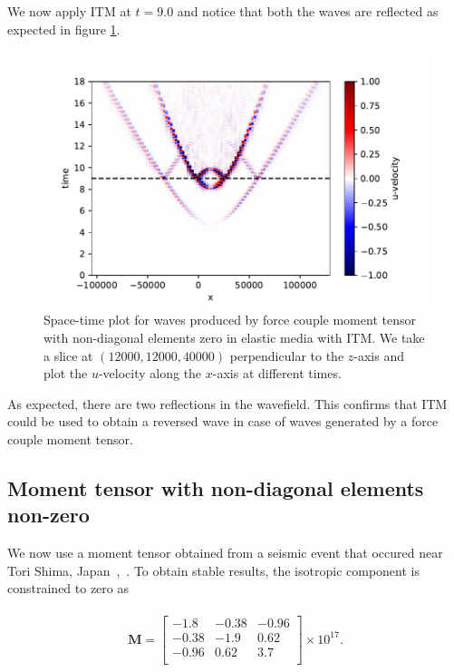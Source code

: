 We now apply \ac{ITM} at $t=9.0$ and notice that both the waves are reflected as expected in figure \ref{fig:space-timeplot-doublecouplediagITM}.

\begin{figure}[htpb]
    \centering
    \includegraphics[width=0.8\linewidth]{figures/double-couple-diag.pdf}
    \caption{Space-time plot for waves produced by force couple moment tensor with non-diagonal elements zero in elastic media with \ac{ITM}. We take a slice at $\left(12000,12000,40000\right)$ perpendicular to the $z$-axis and plot the $u$-velocity along the $x$-axis at different times.}
    \label{fig:space-timeplot-doublecouplediagITM}
\end{figure}
As expected, there are two reflections in the wavefield. This confirms that \ac{ITM} could be used to obtain a reversed wave in case of waves generated by a force couple moment tensor.

\subsection{Moment tensor with non-diagonal elements non-zero}
We now use a moment tensor obtained from a seismic event that occured near Tori Shima, Japan~\parencite{kanamori},~\parencite{shearer_2019}. 
To obtain stable results, the isotropic component is constrained to zero as

\begin{align}
    \begin{split}
        \mathbf{M} =
            \begin{bmatrix}
                -1.8 & -0.38 & -0.96 \\
                -0.38 & -1.9 & 0.62 \\
                -0.96 & 0.62 & 3.7 \\
            \end{bmatrix} \times 10^{17} .
    \end{split}
\end{align}

